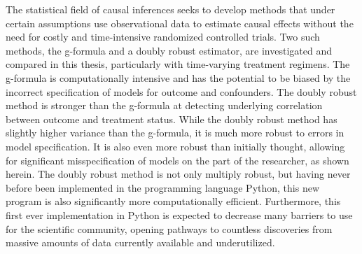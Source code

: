 
The statistical field of causal inferences seeks to develop methods that under certain assumptions use observational data to estimate causal effects without the need for costly and time-intensive randomized controlled trials.  Two such methods, the g-formula and a doubly robust estimator, are investigated and compared in this thesis, particularly with time-varying treatment regimens.  The g-formula is computationally intensive and has the potential to be biased by the incorrect specification of models for outcome and confounders.  The doubly robust method is stronger than the g-formula at detecting underlying correlation between outcome and treatment status.  While the doubly robust method has slightly higher variance than the g-formula, it is much more robust to errors in model specification.  It is also even more robust than initially thought, allowing for significant misspecification of models on the part of the researcher, as shown herein.   The doubly robust method is not only multiply robust, but having never before been implemented in the programming language Python, this new program is also significantly more computationally efficient.  Furthermore, this first ever implementation in Python is expected to decrease many barriers to use for the scientific community, opening pathways to countless discoveries from massive amounts of data currently available and underutilized.  

